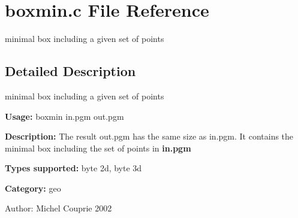 \section{boxmin.c File Reference}
\label{boxmin_8c}
minimal box including a given set of points  




\label{_details}
\subsection{Detailed Description}
minimal box including a given set of points 

{\bf Usage:} boxmin in.pgm out.pgm

{\bf Description:} The result out.pgm has the same size as in.pgm. It contains the minimal box including the set of points in {\bf in.pgm} 

{\bf Types supported:} byte 2d, byte 3d

{\bf Category:} geo

\begin{Desc}
\item[Author:]Michel Couprie 2002 \end{Desc}
